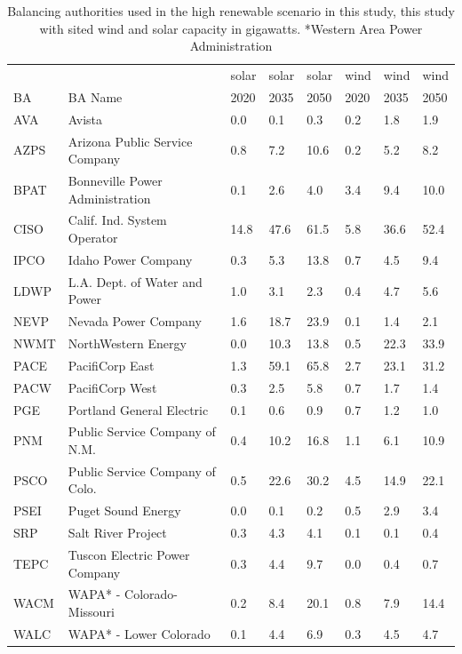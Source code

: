 \documentclass{agujournal2019}
\begin{document}
\begin{table}
\begin{tabular}{llllllll}
     &                                        & solar & solar & solar & wind & wind & wind \\
BA   & BA Name                                & 2020  & 2035  & 2050  & 2020 & 2035 & 2050 \\\hline
AVA  & Avista                                 &   0.0 & 0.1 & 0.3 & 0.2 & 1.8 & 1.9  \\
AZPS & Arizona Public Service Company         &   0.8 & 7.2 & 10.6 & 0.2 & 5.2 & 8.2  \\
BPAT & Bonneville Power Administration        &   0.1 & 2.6 & 4.0 & 3.4 & 9.4 & 10.0  \\
CISO & Calif. Ind. System Operator            &   14.8 & 47.6 & 61.5 & 5.8 & 36.6 & 52.4  \\
IPCO & Idaho Power Company                    &   0.3 & 5.3 & 13.8 & 0.7 & 4.5 & 9.4  \\
LDWP & L.A. Dept. of Water and Power          &   1.0 & 3.1 & 2.3 & 0.4 & 4.7 & 5.6  \\
NEVP & Nevada Power Company                   &   1.6 & 18.7 & 23.9 & 0.1 & 1.4 & 2.1  \\
NWMT & NorthWestern Energy                    &   0.0 & 10.3 & 13.8 & 0.5 & 22.3 & 33.9  \\
PACE & PacifiCorp East                        &   1.3 & 59.1 & 65.8 & 2.7 & 23.1 & 31.2  \\
PACW & PacifiCorp West                        &   0.3 & 2.5 & 5.8 & 0.7 & 1.7 & 1.4  \\
PGE  & Portland General Electric              &   0.1 & 0.6 & 0.9 & 0.7 & 1.2 & 1.0  \\
PNM  & Public Service Company of N.M.         &   0.4 & 10.2 & 16.8 & 1.1 & 6.1 & 10.9  \\
PSCO & Public Service Company of Colo.        &   0.5 & 22.6 & 30.2 & 4.5 & 14.9 & 22.1  \\
PSEI & Puget Sound Energy                     &   0.0 & 0.1 & 0.2 & 0.5 & 2.9 & 3.4  \\
SRP  & Salt River Project                     &   0.3 & 4.3 & 4.1 & 0.1 & 0.1 & 0.4  \\
TEPC & Tuscon Electric Power Company          &   0.3 & 4.4 & 9.7 & 0.0 & 0.4 & 0.7  \\
WACM & WAPA* - Colorado-Missouri               &  0.2 & 8.4 & 20.1 & 0.8 & 7.9 & 14.4   \\
WALC & WAPA* - Lower Colorado                  &  0.1 & 4.4 & 6.9 & 0.3 & 4.5 & 4.7  \\
\hline
\end{tabular}
\caption{Balancing authorities used in the high renewable scenario in this study, this study with sited wind and solar capacity in gigawatts. *Western Area Power Administration}
\label{tab:bas}
\end{table}
\end{document}
